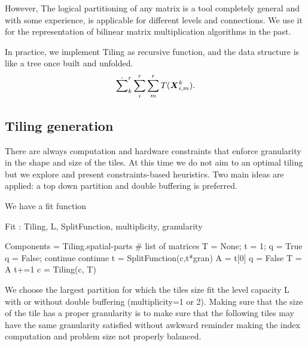 \documentclass[acmsmall]{acmart}
\begin{document}
However, The logical partitioning of any matrix is a tool completely
general and with some experience, is applicable for different levels
and connections. We use it for the representation of bilinear matrix
multiplication algorithms in the past.

In practice, we implement Tiling as recursive function, and the data
structure is like a tree once built and unfolded.
\begin{equation}
\dot\sum_k^r\sum_{i}^r\sum_{m}^r T({\boldsymbol X}^{k}_{i,m}).
\end{equation}


\subsection{Tiling generation}
\label{sec:tiling-generation}
There are always computation and hardware constraints that enforce
granularity in the shape and size of the tiles. At this time we do
not aim to an optimal tiling but we explore and present
constraints-based heuristics. Two main ideas are applied: a top down
partition and double buffering is preferred.

We have a fit function 



{\tiny
  \begin{algorithm}
    \caption{Fit : Tiling, L, SplitFunction, multiplicity, granularity }
    \label{alg:fit}
    \begin{algorithmic}
      \STATE Components = Tiling.spatial-parts    \# list of matrices 
        \STATE T  = None;  t = 1;         q = True
            \STATE q = False; continue
        \ENDIF
            \STATE continue
        \ENDIF
        \STATE t = SplitFunction(c,t*gran) 
        \STATE A = t[0]   
        \STATE q = False
        \STATE T = A
        \ENDIF
        \STATE t+=1
        \ENDWHILE
      \STATE c = Tiling(c, T) 
      \ENDWHILE
    \end{algorithmic}
  \end{algorithm}
}

We choose the largest partition for which the tiles size fit the level
capacity L with or without double buffering (multiplicity=1 or
2). Making sure that the size of the tile has a proper granularity is
to make sure that the following tiles may have the same granularity
satisfied without awkward reminder making the index computation and
problem size not properly balanced.
\end{document}
